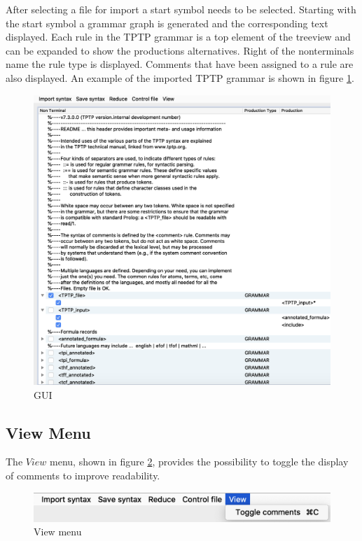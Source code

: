 After selecting a file for import a start symbol needs to be selected.
Starting with the start symbol a grammar graph is generated and the corresponding text displayed.
Each rule in the \ac{TPTP} grammar is a top element of the treeview and can be expanded to show the productions alternatives.
Right of the nonterminals name the rule type is displayed.
Comments that have been assigned to a rule are also displayed. An example of the imported \ac{TPTP} grammar is shown in figure \ref{fig:gui}.

\begin{figure}[H]
\centering
\includegraphics[width=1\textwidth]{images/gui.png}
\caption{GUI}
\label{fig:gui}
\end{figure}

\subsection{View Menu}\label{sec:ConceptGUIViewMenu}

The $View$ menu, shown in figure \ref{fig:view}, provides the possibility to toggle the display of comments to improve readability.

\begin{figure}[H]
\centering
\includegraphics[width=.7\textwidth]{images/view.png}
\caption{View menu}
\label{fig:view}
\end{figure}

